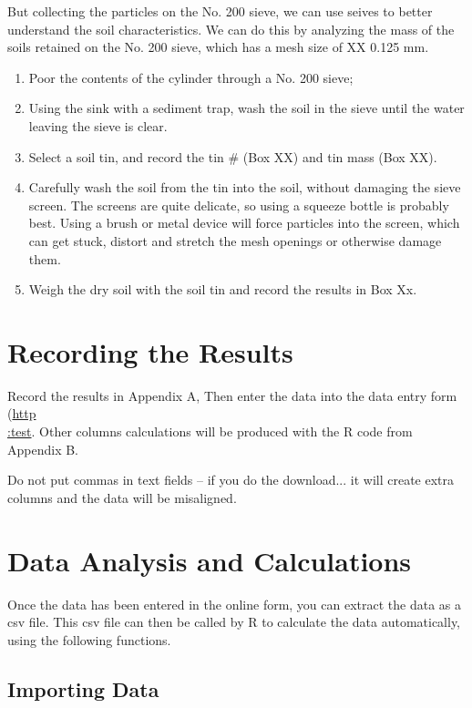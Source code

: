 \documentclass[12pt]{../SOP3_alpha}
\begin{document}
\NP But collecting the particles on the No. 200 sieve, we can use seives to better understand the soil characteristics. We can do this by analyzing the mass of the soils retained on the No. 200 sieve, which has a mesh size of XX 0.125 mm.  

\begin{enumerate}
	\item Poor the contents of the cylinder through a No. 200 sieve;
	\item Using the sink with a sediment trap, wash the soil in the sieve until the water leaving the sieve is clear. 
	\item Select a soil tin, and record the tin \# (Box XX) and tin mass (Box XX). 
	\item Carefully wash the soil from the tin into the soil, without damaging the sieve screen. The screens are quite delicate, so using a squeeze bottle is probably best. Using a brush or metal device will force particles into the screen, which can get stuck, distort and stretch the mesh openings or otherwise damage them. 
	\item Weigh the dry soil with the soil tin and record the results in Box Xx.
\end{enumerate}

\section{Recording the Results}

Record the results in Appendix A, Then enter the data into the data entry form (\href{test}{http\\:test}. Other columns calculations will be produced with the R code from Appendix B.  

Do not put commas in text fields -- if you do the download... it will create extra columns and the data will be misaligned.

\section{Data Analysis and Calculations}

Once the data has been entered in the online form, you can extract the data as a csv file. This csv file can then be called by R to calculate the data automatically, using the following functions. 

\subsection*{Importing Data}
\end{document}
